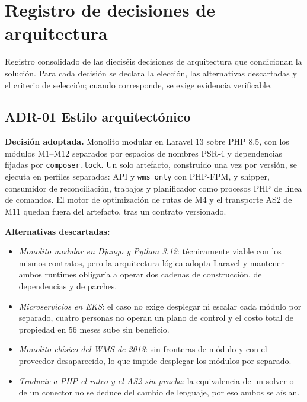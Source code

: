 
\chapter{Registro de decisiones de arquitectura}
\label{sec:m-registro-de-decisiones-de-arquitectura}

Registro consolidado de las dieciséis decisiones de arquitectura que condicionan la solución. Para cada decisión se declara la elección, las alternativas descartadas y el criterio de selección; cuando corresponde, se exige evidencia verificable.

\section{ADR-01 \textperiodcentered{} Estilo arquitectónico}
\label{sub:adr-01}

\textbf{Decisión adoptada.} Monolito modular en Laravel 13 sobre PHP 8.5, con los módulos M1--M12 separados por espacios de nombres PSR-4 y dependencias fijadas por \texttt{composer.lock}. Un solo artefacto, construido una vez por versión, se ejecuta en perfiles separados: API y \texttt{wms\_only} con PHP-FPM, y shipper, consumidor de reconciliación, trabajos y planificador como procesos PHP de línea de comandos. El motor de optimización de rutas de M4 y el transporte AS2 de M11 quedan fuera del artefacto, tras un contrato versionado.

\textbf{Alternativas descartadas:}

\begin{itemize}
  \item \emph{Monolito modular en Django y Python 3.12}: técnicamente viable con los mismos contratos, pero la arquitectura lógica adopta Laravel y mantener ambos runtimes obligaría a operar dos cadenas de construcción, de dependencias y de parches.
  \item \emph{Microservicios en EKS}: el caso no exige desplegar ni escalar cada módulo por separado, cuatro personas no operan un plano de control y el costo total de propiedad en 56 meses sube sin beneficio.
  \item \emph{Monolito clásico del WMS de 2013}: sin fronteras de módulo y con el proveedor desaparecido, lo que impide desplegar los módulos por separado.
  \item \emph{Traducir a PHP el ruteo y el AS2 sin prueba}: la equivalencia de un solver o de un conector no se deduce del cambio de lenguaje, por eso ambos se aíslan.
\end{itemize}

